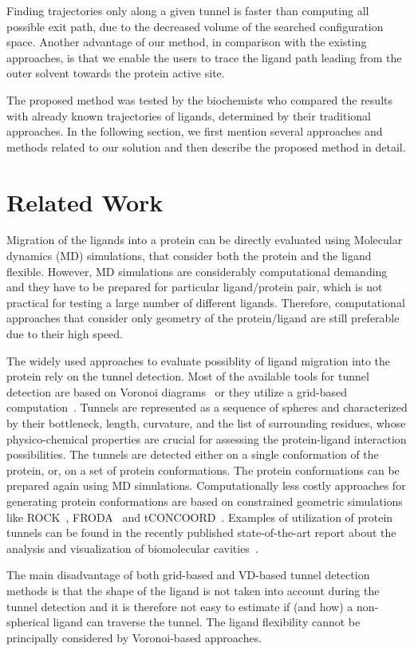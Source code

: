 \documentclass[usletter, 10pt, conference]{ieeeconf} %
\begin{document}
Finding trajectories only along a given tunnel is faster than computing all possible exit path, due to the decreased volume of the searched configuration space.
Another advantage of our method, in comparison with the existing approaches, is that we enable the users to trace the ligand path leading from the
outer solvent towards the protein active site.

The proposed method was tested by the biochemists who compared the results with already known trajectories of ligands, determined by their traditional approaches.
In the following section, we first mention several approaches and methods related to our solution and then describe the proposed method in detail.

\section{Related Work}
{\color{red}
Migration of the ligands into a protein can be directly evaluated using Molecular dynamics (MD) simulations, that consider both 
the protein and the ligand flexible.
However, MD simulations are considerably computational demanding~\cite{kingsley2014including} and they have to be prepared
for particular ligand/protein pair, which is not practical for testing a large number of different ligands.
Therefore, computational approaches that consider only geometry of the protein/ligand are still preferable due to their high speed.

The widely used approaches to evaluate possiblity of ligand migration into the protein rely on the tunnel detection.
Most of the available tools for tunnel detection are based on Voronoi diagrams~\cite{yaffe2008,caver3} or they utilize a grid-based computation~\cite{sehnal2013mole}.
Tunnels are represented as a sequence of spheres and characterized by their bottleneck, length, curvature, and the list of surrounding residues, whose physico-chemical properties are crucial for assessing the protein-ligand interaction possibilities.
The tunnels are detected either on a single conformation of the protein, or, on a set of protein conformations.
The protein conformations can be prepared again using MD simulations.
Computationally less costly approaches for generating protein conformations are based on constrained geometric simulations like
ROCK~\cite{lei2004sampling}, FRODA~\cite{wells2005constrained} and tCONCOORD~\cite{seeliger2007geometry}.
Examples of utilization of protein tunnels can be found in the recently published state-of-the-art report about the analysis and visualization of biomolecular cavities~\cite{Krone_2016}.

The main disadvantage of both grid-based and VD-based tunnel detection methods is that the shape of the ligand is not taken into account during the tunnel detection and it is therefore not easy to estimate if (and how) a non-spherical ligand can traverse the tunnel.
The ligand flexibility cannot be principally considered by Voronoi-based approaches.
}
\end{document}
